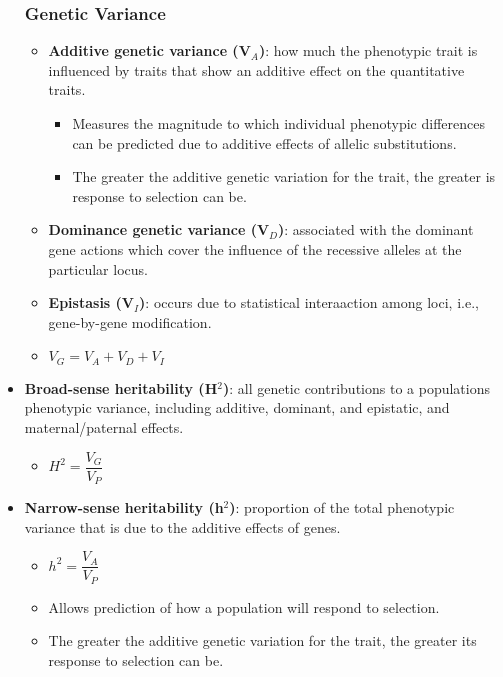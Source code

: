 \documentclass[12pt,a4paper]{article}
\begin{document}
\begin{itemize}
    \subsubsection{Genetic Variance}
    \begin{itemize}
        \item \textbf{Additive genetic variance (V\(_{A}\))}: how much the phenotypic trait is influenced by traits that show an additive effect on the quantitative traits.
            \begin{itemize}
                \item Measures the magnitude to which individual phenotypic differences can be predicted due to additive effects of allelic substitutions.
                \item The greater the additive genetic variation for the trait, the greater is response to selection can be.
            \end{itemize}
        \item \textbf{Dominance genetic variance (V\(_{D}\))}: associated with the dominant gene actions which cover the influence of the recessive alleles at the particular locus.
        \item \textbf{Epistasis (V\(_{I}\))}: occurs due to statistical interaaction among loci, i.e., gene-by-gene modification.
        \item  {\color{o-Sun}\(V_G = V_A + V_D + V_I\)}
    \end{itemize}
    \item \textbf{Broad-sense heritability (H\(^{2}\))}: {\color{o-Sun}all genetic contributions} to a populations phenotypic variance, including additive, dominant, and epistatic, and maternal/paternal effects. 
        \begin{itemize}
            \item \(H^2 = \dfrac{V_G}{V_P}\)
        \end{itemize}
    \item \textbf{Narrow-sense heritability (h\(^{2}\))}: proportion of the total phenotypic variance that is due to the {\color{o-Sun}additive effects} of genes.
        \begin{itemize}
            \item \(h^2 = \dfrac{V_A}{V_P}\)
            \item Allows prediction of how a population will respond to selection.
            \item The greater the additive genetic variation for the trait, the greater its response to selection can be.
        \end{itemize}

\end{itemize}
\end{document}
